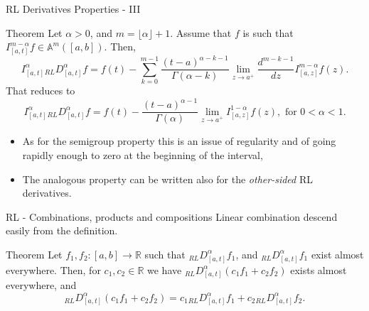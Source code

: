 \documentclass[aspectratio=169,xcolor=dvipsnames]{beamer}
\begin{document}
\begin{frame}{RL Derivatives Properties - III}

\begin{alertblock}{Theorem}
Let $\alpha > 0$, and $m = \lfloor\alpha\rfloor + 1$. Assume that $f$ is such that $I_{[a,t]}^{m-\alpha} f \in \mathbb{A}^m([a,b])$. Then,
\[
I_{[a,t]}^{\alpha} {}_{RL}{D_{[a,t]}^{\alpha}} f = f(t) - \sum_{k=0}^{m-1} \frac{(t-a)^{\alpha-k-1}}{\Gamma(\alpha-k)} \lim_{z \rightarrow a^+} \frac{d^{m-k-1}}{d z} I_{[a,z]}^{m-\alpha} f(z).
\]
That reduces to
\[
I_{[a,t]}^{\alpha} {}_{RL}{D_{[a,t]}^{\alpha}} f = f(t) - \frac{(t-a)^{\alpha-1}}{\Gamma(\alpha)} \lim_{z\rightarrow a^+} I_{[a,z]}^{1-\alpha} f(z), \text{ for } 0 < \alpha < 1.
\]
\end{alertblock}

\begin{itemize}
	\item As for the semigroup property this is an issue of regularity and of going rapidly enough to zero at the beginning of the interval,
	\item The analogous property can be written also for the \emph{other-sided} RL derivatives.
\end{itemize}


\end{frame}

\begin{frame}{RL - Combinations, products and compositions}
Linear combination descend easily from the definition. 
\begin{alertblock}{Theorem}
	Let $f_1,f_2 : [a,b] \rightarrow \mathbb{R}$ such that ${}_{RL}{D_{[a,t]}^{\alpha}} f_1$, and ${}_{RL}{D_{[a,t]}^{\alpha}} f_1$ exist almost everywhere. Then, for $c_1,c_2 \in \mathbb{R}$ we have ${}_{RL}{D_{[a,t]}^{\alpha}} (c_1 f_1 + c_2 f_2)$ exists almost everywhere, and\vspace{-1em}
	\[ {}_{RL}{D_{[a,t]}^{\alpha}} (c_1 f_1 + c_2 f_2) = c_1 {}_{RL}{D_{[a,t]}^{\alpha}} f_1 + c_2 {}_{RL}{D_{[a,t]}^{\alpha}} f_2. \]
\end{alertblock}
\end{frame}
\end{document}
